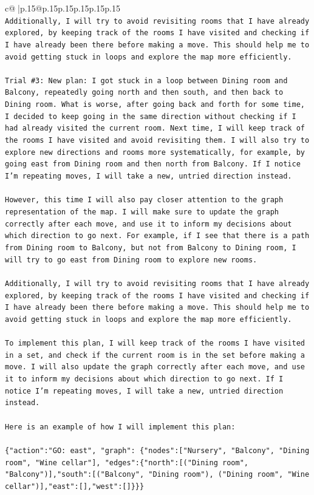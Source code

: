 \documentclass{article}
\begin{document}
{\begin{supertabular}{c@{$\;$}|p{.15\linewidth}@{}p{.15\linewidth}p{.15\linewidth}p{.15\linewidth}p{.15\linewidth}p{.15\linewidth}}
{{{\\ 
\texttt{Additionally, I will try to avoid revisiting rooms that I have already explored, by keeping track of the rooms I have visited and checking if I have already been there before making a move. This should help me to avoid getting stuck in loops and explore the map more efficiently.} \\
\\ 
\texttt{Trial \#3: New plan: I got stuck in a loop between Dining room and Balcony, repeatedly going north and then south, and then back to Dining room. What is worse, after going back and forth for some time, I decided to keep going in the same direction without checking if I had already visited the current room. Next time, I will keep track of the rooms I have visited and avoid revisiting them. I will also try to explore new directions and rooms more systematically, for example, by going east from Dining room and then north from Balcony. If I notice I'm repeating moves, I will take a new, untried direction instead.} \\
\\ 
\texttt{However, this time I will also pay closer attention to the graph representation of the map. I will make sure to update the graph correctly after each move, and use it to inform my decisions about which direction to go next. For example, if I see that there is a path from Dining room to Balcony, but not from Balcony to Dining room, I will try to go east from Dining room to explore new rooms.} \\
\\ 
\texttt{Additionally, I will try to avoid revisiting rooms that I have already explored, by keeping track of the rooms I have visited and checking if I have already been there before making a move. This should help me to avoid getting stuck in loops and explore the map more efficiently.} \\
\\ 
\texttt{To implement this plan, I will keep track of the rooms I have visited in a set, and check if the current room is in the set before making a move. I will also update the graph correctly after each move, and use it to inform my decisions about which direction to go next. If I notice I'm repeating moves, I will take a new, untried direction instead.} \\
\\ 
\texttt{Here is an example of how I will implement this plan:} \\
\\ 
\texttt{\{"action":"GO: east", "graph": \{"nodes":{[}"Nursery", "Balcony", "Dining room", "Wine cellar"{]}, "edges":\{"north":{[}("Dining room", "Balcony"){]},"south":{[}("Balcony", "Dining room"), ("Dining room", "Wine cellar"){]},"east":{[}{]},"west":{[}{]}\}\}\}} \\
}}}
\end{supertabular}}
\end{document}
